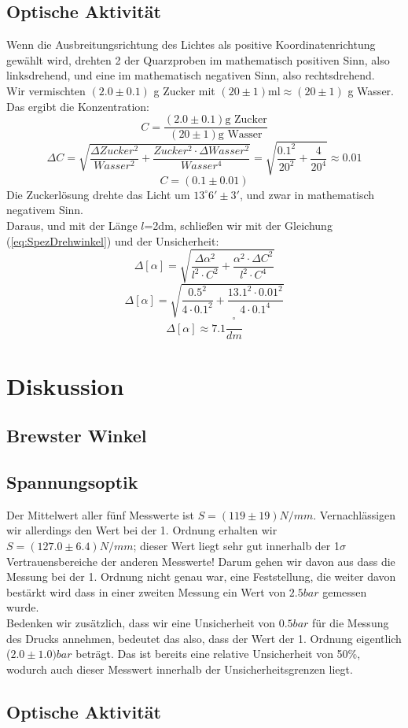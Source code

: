 \documentclass{article}
\begin{document}
\subsection{Optische Aktivität}
Wenn die Ausbreitungsrichtung des Lichtes als positive Koordinatenrichtung gewählt wird, drehten 2 der Quarzproben im mathematisch positiven Sinn, also linksdrehend, und eine im mathematisch negativen Sinn, also rechtsdrehend.\\
Wir vermischten $(2.0 \pm 0.1)$ g Zucker mit $(20 \pm 1)\text{ml} \approx (20 \pm 1)$ g Wasser. Das ergibt die Konzentration:
$$C=\frac{(2.0 \pm 0.1) \text{g Zucker}}{(20 \pm 1) \text{g Wasser}}$$
$$\Delta C= \sqrt{\frac{\Delta Zucker^2}{Wasser^2}+\frac{Zucker^2 \cdot \Delta Wasser^2}{Wasser^4}} = \sqrt{\frac{0.1^2}{20^2}+\frac{4}{20^4}}\approx 0.01$$
\vspace{0.5cm}
$$C=(0.1\pm0.01)$$
Die Zuckerlösung drehte das Licht um $13^\circ 6' \pm 3'$, und zwar in mathematisch negativem Sinn. \\
Daraus, und mit der Länge $l$=2dm, schließen wir mit der Gleichung (\ref{eq:SpezDrehwinkel}) und der Unsicherheit:
$$\Delta [\alpha] = \sqrt{\frac{\Delta \alpha^2}{l^2\cdot C^2}+\frac{\alpha^2 \cdot \Delta C ^2}{l^2\cdot C^4}}$$
$$\Delta [\alpha] = \sqrt{\frac{0.5^2}{4\cdot 0.1^2}+\frac{13.1^2\cdot 0.01^2}{4 \cdot 0.1^4}}$$
$$\Delta [\alpha] \approx 7.1 \frac{^\circ}{dm}$$

\begin{center}
\end{center}
\section{Diskussion}
\subsection{Brewster Winkel}
\subsection{Spannungsoptik}

Der Mittelwert aller fünf Messwerte ist $S=(119 \pm 19)\si{N/mm}$. Vernachlässigen wir allerdings den Wert bei der 1. Ordnung erhalten wir $S=(127.0 \pm 6.4)\si{N/mm}$; dieser Wert liegt sehr gut innerhalb der 1$\sigma$ Vertrauensbereiche der anderen Messwerte! Darum gehen wir davon aus dass die Messung bei der 1. Ordnung nicht genau war, eine Feststellung, die weiter davon bestärkt wird dass in einer zweiten Messung ein Wert von $2.5 \si{bar}$ gemessen wurde.\\
Bedenken wir zusätzlich, dass wir eine Unsicherheit von $0.5 \si{bar}$ für die Messung des Drucks annehmen, bedeutet das also, dass der Wert der 1. Ordnung eigentlich ($2.0 \pm 1.0)\si{bar}$ beträgt. Das ist bereits eine relative Unsicherheit von 50\%, wodurch auch dieser Messwert innerhalb der Unsicherheitsgrenzen liegt. 

\subsection{Optische Aktivität}
																					
\end{document}
